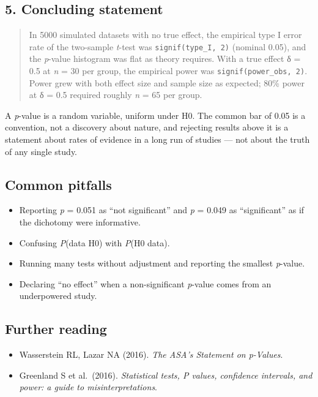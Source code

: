 \documentclass[
]{article}
\providecommand{\tightlist}{%
  \setlength{\itemsep}{0pt}\setlength{\parskip}{0pt}}
\begin{document}
\subsection{5. Concluding statement}\label{concluding-statement}

\begin{quote}
In 5000 simulated datasets with no true effect, the empirical type I
error rate of the two-sample \emph{t}-test was
\texttt{signif(type\_I,\ 2)} (nominal 0.05), and the \emph{p}-value
histogram was flat as theory requires. With a true effect δ = 0.5 at
\emph{n} = 30 per group, the empirical power was
\texttt{signif(power\_obs,\ 2)}. Power grew with both effect size and
sample size as expected; 80\% power at δ = 0.5 required roughly \emph{n}
= 65 per group.
\end{quote}

A \emph{p}-value is a random variable, uniform under H0. The common bar
of 0.05 is a convention, not a discovery about nature, and rejecting
results above it is a statement about rates of evidence in a long run of
studies --- not about the truth of any single study.

\subsection{Common pitfalls}\label{common-pitfalls}

\begin{itemize}
\tightlist
\item
  Reporting \emph{p} = 0.051 as ``not significant'' and \emph{p} = 0.049
  as ``significant'' as if the dichotomy were informative.
\item
  Confusing \emph{P}(data \textbar{} H0) with \emph{P}(H0 \textbar{}
  data).
\item
  Running many tests without adjustment and reporting the smallest
  \emph{p}-value.
\item
  Declaring ``no effect'' when a non-significant \emph{p}-value comes
  from an underpowered study.
\end{itemize}

\subsection{Further reading}\label{further-reading}

\begin{itemize}
\tightlist
\item
  Wasserstein RL, Lazar NA (2016). \emph{The ASA's Statement on
  p-Values}.
\item
  Greenland S et al.~(2016). \emph{Statistical tests, P values,
  confidence intervals, and power: a guide to misinterpretations}.
\end{itemize}
\end{document}
